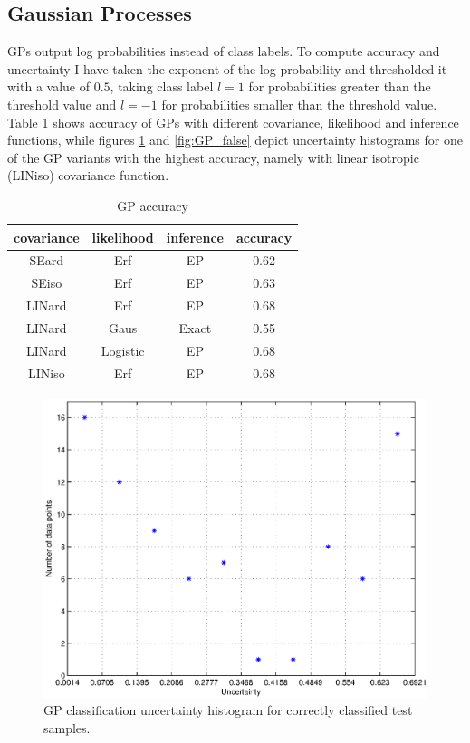 \documentclass[journal, a4paper]{IEEEtran}
\begin{document}
  \subsection{Gaussian Processes}
      GPs output log probabilities instead of class labels. To compute accuracy and uncertainty I have taken the exponent of the log probability and thresholded it with a value of $0.5$, taking class label $l=1$ for probabilities greater than the threshold value and $l=-1$ for probabilities smaller than the threshold value. Table \ref{tab:GP_acc} shows accuracy of GPs with different covariance, likelihood and inference functions, while figures \ref{fig:GP_true} and \ref{fig:GP_false} depict uncertainty histograms for one of the GP variants with the highest accuracy, namely with linear isotropic (LINiso) covariance function.
      
      
    \begin{table}[ht]
      \begin{center}
	\caption{GP accuracy}
	\label{tab:GP_acc}
	\begin{tabular}{c|c|c|c}
	  covariance & likelihood  & inference  & accuracy \\ \hline
	  SEard & Erf & EP & 0.62\\ \hline
	  SEiso & Erf & EP & 0.63\\ \hline
	  LINard & Erf & EP & 0.68\\ \hline
	  LINard & Gaus & Exact & 0.55\\ \hline
	  LINard & Logistic & EP & 0.68\\ \hline
	  LINiso & Erf & EP & 0.68
	\end{tabular}
      \end{center}
    \end{table}

    \begin{figure}[ht]
      \centering
      \includegraphics[width=.8\linewidth]{covLINiso_likErf_infEP_true}
      \caption{GP classification uncertainty histogram for correctly classified test samples.}
      \label{fig:GP_true}
    \end{figure}
\end{document}
